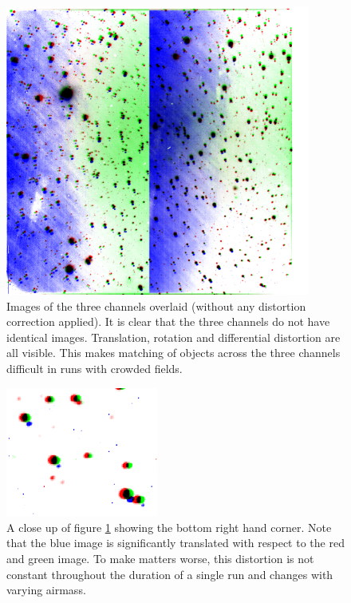 \begin{figure}
  \centering
  \includegraphics[width=100mm]{images/overlay_multiply.png}
  \caption{Images of the three channels overlaid (without any distortion correction applied). It is clear that the three channels do not have identical images. Translation, rotation and differential distortion are all visible. This makes matching of objects across the three channels difficult in runs with crowded fields. }
\label{fig:nonoverlap}
\end{figure}

\begin{figure}
  \centering
  \includegraphics[width=50mm]{images/overlay_multiply_closeup.png}
  \caption{A close up of figure \ref{fig:nonoverlap} showing the bottom right hand corner. Note that the blue image is significantly translated with respect to the red and green image. To make matters worse, this distortion is not constant throughout the duration of a single run and changes with varying airmass.}
\label{fig:nonoverlapzoom}
\end{figure}

